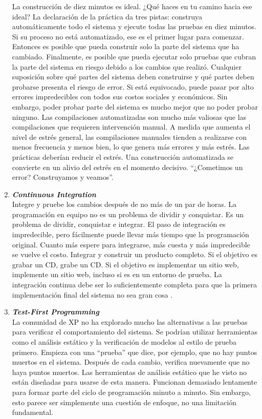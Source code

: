 \begin{spacing}{1.5}
\begin{enumerate}
				La construcción de diez minutos es ideal. ¿Qué haces en tu camino hacia ese ideal? La declaración de la práctica da tres pistas: construya automáticamente todo el sistema y ejecute todas las pruebas en diez minutos. Si su proceso no está automatizado, ese es el primer lugar para comenzar. Entonces es posible que pueda construir solo la parte del sistema que ha cambiado. Finalmente, es posible que pueda ejecutar solo pruebas que cubran la parte del sistema en riesgo debido a los cambios que realizó. Cualquier suposición sobre qué partes del sistema deben construirse y qué partes deben probarse presenta el riesgo de error. Si está equivocado, puede pasar por alto errores impredecibles con todos sus costos sociales y económicos. Sin embargo, poder probar parte del sistema es mucho mejor que no poder probar ninguno. Las compilaciones automatizadas son mucho más valiosas que las compilaciones que requieren intervención manual. A medida que aumenta el nivel de estrés general, las compilaciones manuales tienden a realizarse con menos frecuencia y menos bien, lo que genera más errores y más estrés. Las prácticas deberían reducir el estrés. Una construcción automatizada se convierte en un alivio del estrés en el momento decisivo. “¿Cometimos un error? Construyamos y veamos\cite{chap2_extreme_programming}”.
				\item \textit{\textbf{Continuous Integration}}\\
				Integre y pruebe los cambios después de no más de un par de horas. La programación en equipo no es un problema de dividir y conquistar. Es un problema de dividir, conquistar e integrar. El paso de integración es impredecible, pero fácilmente puede llevar más tiempo que la programación original. Cuanto más espere para integrarse, más cuesta y más impredecible se vuelve el costo.
				Integrar y construir un producto completo. Si el objetivo es grabar un CD, grabe un CD. Si el objetivo es implementar un sitio web, implemente un sitio web, incluso si es en un entorno de prueba. La integración continua debe ser lo suficientemente completa para que la primera implementación final del sistema no sea gran cosa \cite{chap2_extreme_programming}.
				\item \textit{\textbf{Test-First Programming}}\\
				La comunidad de XP no ha explorado mucho las alternativas a las pruebas para verificar el comportamiento del sistema. Se podrían utilizar herramientas como el análisis estático y la verificación de modelos al estilo de prueba primero. Empieza con una ``prueba'' que dice, por ejemplo, que no hay puntos muertos en el sistema. Después de cada cambio, verifica nuevamente que no haya puntos muertos. Las herramientas de análisis estático que he visto no están diseñadas para usarse de esta manera. Funcionan demasiado lentamente para formar parte del ciclo de programación minuto a minuto. Sin embargo, esto parece ser simplemente una cuestión de enfoque, no una limitación fundamental.				

\end{enumerate}
\end{spacing}
